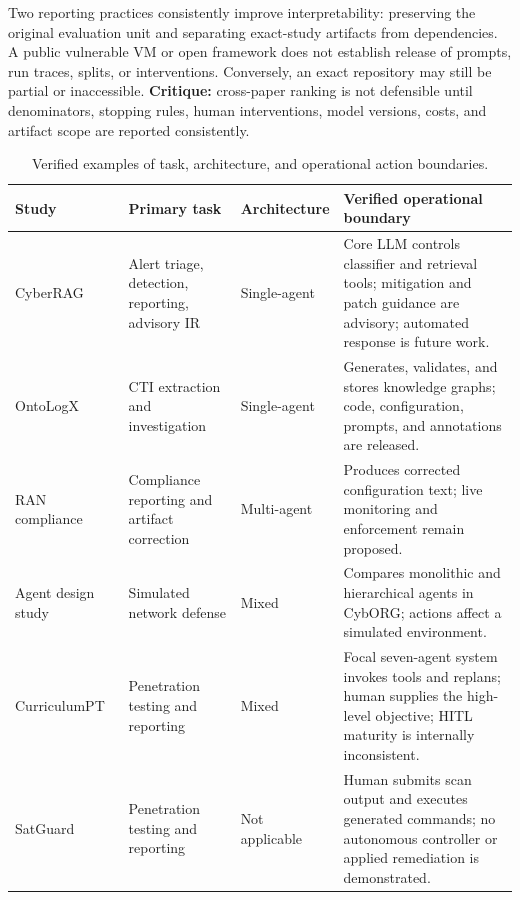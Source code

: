 Two reporting practices consistently improve interpretability: preserving the original evaluation unit and separating exact-study artifacts from dependencies. A public vulnerable VM or open framework does not establish release of prompts, run traces, splits, or interventions. Conversely, an exact repository may still be partial or inaccessible. \textbf{Critique:} cross-paper ranking is not defensible until denominators, stopping rules, human interventions, model versions, costs, and artifact scope are reported consistently.

\begin{table}[tbp]
  \caption{Verified examples of task, architecture, and operational action boundaries.}\label{tab:comparison-1}
  \scriptsize
  \begin{tabular}{@{}p{}p{}p{}p{}@{}}
    \toprule
    Study & Primary task & Architecture & Verified operational boundary \\
    \midrule
    CyberRAG~\cite{R0447_Blefari_2026} & Alert triage, detection, reporting, advisory IR & Single-agent & Core LLM controls classifier and retrieval tools; mitigation and patch guidance are advisory; automated response is future work. \\
    OntoLogX~\cite{R0365_Cotti_2026} & CTI extraction and investigation & Single-agent & Generates, validates, and stores knowledge graphs; code, configuration, prompts, and annotations are released. \\
    RAN compliance~\cite{R0340_Chatzimiltis_2026} & Compliance reporting and artifact correction & Multi-agent & Produces corrected configuration text; live monitoring and enforcement remain proposed. \\
    Agent design study~\cite{R0484_Bogdanov_2026} & Simulated network defense & Mixed & Compares monolithic and hierarchical agents in CybORG; actions affect a simulated environment. \\
    CurriculumPT~\cite{R0322_Wu_2025} & Penetration testing and reporting & Mixed & Focal seven-agent system invokes tools and replans; human supplies the high-level objective; HITL maturity is internally inconsistent. \\
    SatGuard~\cite{R0384_Xiao_2025} & Penetration testing and reporting & Not applicable & Human submits scan output and executes generated commands; no autonomous controller or applied remediation is demonstrated. \\
    \bottomrule
  \end{tabular}
\end{table}

